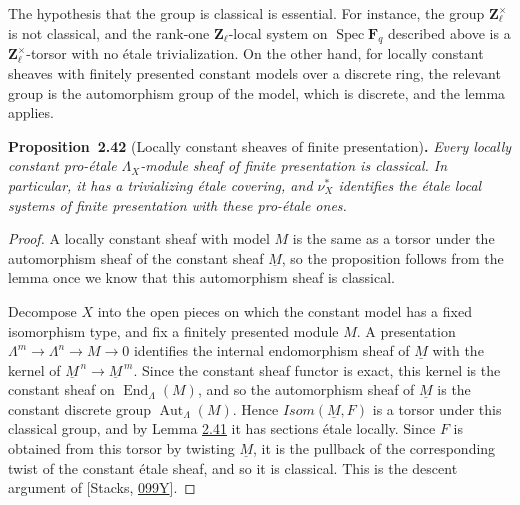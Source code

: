\documentclass[11pt]{article}
\newenvironment{bpstatement}[2]{\par\addvspace{0.6\baselineskip}\noindent\textbf{#1}#2\textbf{.}\enspace\ignorespaces}
  {\par\addvspace{0.4\baselineskip}}
\newenvironment{bpstatementit}[2]{\begin{bpstatement}{#1}{#2}\itshape\ignorespaces}{\end{bpstatement}}
\begin{document}
\label{bp125}%
The hypothesis that the group is classical is essential. For instance, the group \(\mathbf Z_\ell^\times\) is not classical, and the rank-one \(\mathbf Z_\ell\)-local system on \(\operatorname{Spec}\mathbf F_q\) described above is a \(\mathbf Z_\ell^\times\)-torsor with no étale trivialization. On the other hand, for locally constant sheaves with finitely presented constant models over a discrete ring, the relevant group is the automorphism group of the model, which is discrete, and the lemma applies.

\label{bp126}%
\begin{bpstatementit}{Proposition~2.42}{ (Locally constant sheaves of finite presentation)}
Every locally constant pro-étale \(\Lambda_X\)-module sheaf of finite presentation is classical. In particular, it has a trivializing étale covering, and \(\nu_X^*\) identifies the étale local systems of finite presentation with these pro-étale ones.
\end{bpstatementit}

\begin{proof}[{Proof}]\label{bp127}%
A locally constant sheaf with model \(M\) is the same as a torsor under the automorphism sheaf of the constant sheaf \(\underline M\), so the proposition follows from the lemma once we know that this automorphism sheaf is classical.

Decompose \(X\) into the open pieces on which the constant model has a fixed isomorphism type, and fix a finitely presented module \(M\). A presentation \(\Lambda^m\to\Lambda^n\to M\to0\) identifies the internal endomorphism sheaf of \(\underline M\) with the kernel of \(\underline M^{\,n}\to\underline M^{\,m}\). Since the constant sheaf functor is exact, this kernel is the constant sheaf on \(\operatorname{End}_\Lambda(M)\), and so the automorphism sheaf of \(\underline M\) is the constant discrete group \(\operatorname{Aut}_\Lambda(M)\). Hence \(\mathit{Isom}(\underline M,F)\) is a torsor under this classical group, and by Lemma \hyperref[bp123]{2.41} it has sections étale locally. Since \(F\) is obtained from this torsor by twisting \(\underline M\), it is the pullback of the corresponding twist of the constant étale sheaf, and so it is classical. This is the descent argument of [Stacks, \href{https://stacks.math.columbia.edu/tag/099Y}{099Y}].
\end{proof}
\end{document}
